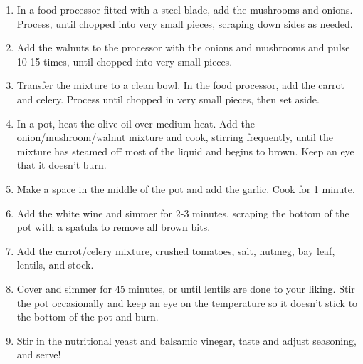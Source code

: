 \begin{enumerate}
    \item In a food processor fitted with a steel blade, add the mushrooms and onions. Process, until chopped into very small pieces, scraping down sides as needed.
    \item Add the walnuts to the processor with the onions and mushrooms and pulse 10-15 times, until chopped into very small pieces.
    \item Transfer the mixture to a clean bowl. In the food processor, add the carrot and celery. Process until chopped in very small pieces, then set aside.
    \item In a pot, heat the olive oil over medium heat. Add the onion/mushroom/walnut mixture and cook, stirring frequently, until the mixture has steamed off most of the liquid and begins to brown. Keep an eye that it doesn't burn.
    \item Make a space in the middle of the pot and add the garlic. Cook for 1 minute.
    \item Add the white wine and simmer for 2-3 minutes, scraping the bottom of the pot with a spatula to remove all brown bits.
    \item Add the carrot/celery mixture, crushed tomatoes, salt, nutmeg, bay leaf, lentils, and stock.
    \item Cover and simmer for 45 minutes, or until lentils are done to your liking. Stir the pot occasionally and keep an eye on the temperature so it doesn't stick to the bottom of the pot and burn.
    \item Stir in the nutritional yeast and balsamic vinegar, taste and adjust seasoning, and serve!
\end{enumerate}

